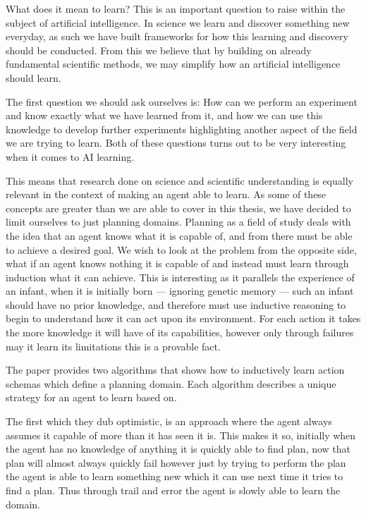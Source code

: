 \documentclass[Master.tex]{subfiles}
\begin{document}
	What does it mean to learn? This is an important question to raise within the subject of artificial intelligence.
	In science we learn and discover something new everyday, as such we have built frameworks for how this learning and discovery should be conducted. From this we believe that by building on already fundamental scientific methods, we may simplify how an artificial intelligence should learn.
	
	The first question we should ask ourselves is: How can we perform an experiment and know exactly what we have learned from it, 
	and how we can use this knowledge to develop further experiments highlighting another aspect of the field we are trying to learn.
	Both of these questions turns out to be very interesting when it comes to AI learning.
	
	This means that research done on science and scientific understanding is equally relevant in the context of making an agent able to learn.
	As some of these concepts are greater than we are able to cover in this thesis, we have decided to limit ourselves to just planning domains.	 
	Planning as a field of study deals with the idea that an agent knows what it is capable of, 
	and from there must be able to achieve a desired goal. 
	We wish to look at the problem from the opposite side, what if an agent knows nothing it is capable of and instead must learn through induction what it can achieve. 
	This is interesting as it parallels the experience of an infant, when it is initially born  --- ignoring genetic memory --- such an infant should have no prior knowledge, and therefore must use inductive reasoning to begin to understand how it can act upon its environment. For each action it takes the more knowledge it will have of its capabilities, however only through failures may it learn its limitations this is a provable fact.
	 
	
	
	The \cite{Walsh2008} paper provides two algorithms that shows how to inductively learn action schemas which define a planning domain. 
	Each algorithm describes a unique strategy for an agent to learn based on. 
	
	The first which they dub optimistic, is an approach where the agent always assumes it capable of more than it has seen it is. This makes it so, initially when the agent has no knowledge of anything it is quickly able to find plan, now that plan will almost always quickly fail however just by trying to perform the plan the agent is able to learn something new which it can use next time it tries to find a plan. Thus through trail and error the agent is slowly able to learn the domain.
	
\end{document}
